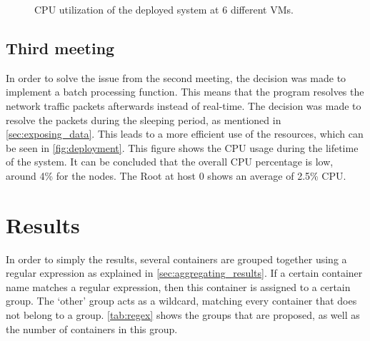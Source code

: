 \begin{figure}[H]
    \caption{CPU utilization of the deployed system at 6 different VMs.}
    \label{fig:deployment}
\end{figure}

\subsection{Third meeting}
In order to solve the issue from the second meeting, the decision was made to implement a batch processing function. This means that the program resolves the network traffic packets afterwards instead of real-time. The decision was made to resolve the packets during the sleeping period, as mentioned in \autoref{sec:exposing_data}. This leads to a more efficient use of the resources, which can be seen in \autoref{fig:deployment}. This figure shows the CPU usage during the lifetime of the system. It can be concluded that the overall  CPU percentage is low, around 4\% for the nodes. The Root at host $0$ shows an average of 2.5\% CPU.

\section{Results}\label{sec:sb-results}
In order to simply the results, several containers are grouped together using a regular expression as explained in \autoref{sec:aggregating_results}. If a certain container name matches a regular expression, then this container is assigned to a certain group. The `other' group acts as a wildcard, matching every container that does not belong to a group. \autoref{tab:regex} shows the groups that are proposed, as well as the number of containers in this group.\\

